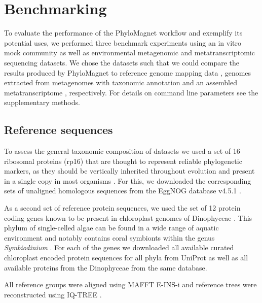 \documentclass[a4paper]{article}
\begin{document}
\section{Benchmarking}
To evaluate the performance of the PhyloMagnet workflow and exemplify its potential uses, we performed three benchmark experiments using an in vitro mock community as well as environmental metagenomic and metatranscriptomic sequencing datasets. We chose the datasets such that we could compare the results produced by PhyloMagnet to reference genome mapping data \citep{Singer2016}, genomes extracted from metagenomes with taxonomic annotation \citep{Delmont2018} and an assembled metatranscriptome \citep{Frazier2017}, respectively. For details on command line parameters see the supplementary methods.

\subsection{Reference sequences}
To assess the general taxonomic composition of datasets we used a set of 16 ribosomal proteins (rp16) that are thought to represent reliable phylogenetic markers, as they should be vertically inherited throughout evolution and present in a single copy in most organisms \citep{Brown2015}. For this, we downloaded the corresponding sets of unaligned homologous sequences from the EggNOG database v4.5.1 \citep{Huerta-cepas2016b}.%

As a second set of reference protein sequences, we used the set of 12 protein coding genes known to be present in chloroplast genomes of Dinophyceae \citep{Howe2008}. This phylum of single-celled algae can be found in a wide range of aquatic environment and notably contains coral symbionts within the genus \textit{Symbiodinium} \citep{Gomez2012}. For each of the genes we downloaded all available curated chloroplast encoded protein sequences for all phyla from UniProt \citep{Apweiler2004} as well as all available proteins from the Dinophyceae from the same database.

All reference groups were aligned using MAFFT E-INS-i \citep{Katoh2013} and reference trees were reconstructed using IQ-TREE \citep[under the LG+G+F model;][]{Nguyen2015}.
\end{document}
